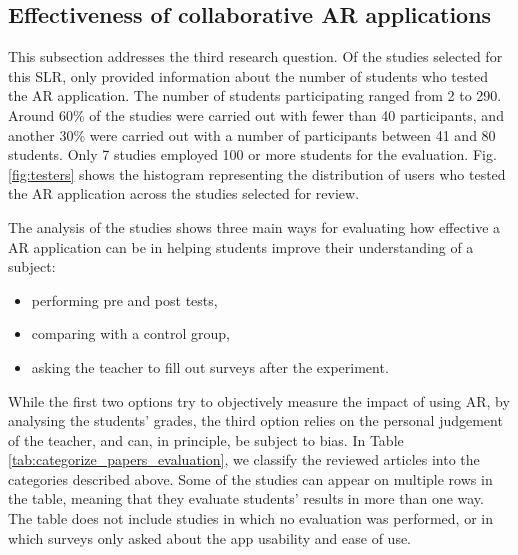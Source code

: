 \subsection{Effectiveness of collaborative AR applications}

This subsection addresses the third research question. Of the \papersSelected studies selected for this \gls{SLR}, only \papersWithNumStudentInfo provided information about the number of students who tested the AR application. The number of students participating ranged from 2 to 290. Around 60\% of the studies were carried out with fewer than 40 participants, and another 30\% were carried out with a number of participants between 41 and 80 students. Only 7 studies employed 100 or more students for the evaluation. Fig. \ref{fig:testers} shows the histogram representing the distribution of users who tested the \gls{AR} application across the studies selected for review.

The analysis of the studies shows three main ways for evaluating how effective a \gls{AR} application can be in helping students improve their understanding of a subject:
\begin{itemize}
    \item performing pre and post tests,
    \item comparing with a control group,
    \item asking the teacher to fill out surveys after the experiment.
\end{itemize}

% 	

While the first two options try to objectively measure the impact of using \gls{AR}, by analysing the students' grades, the third option relies on the personal judgement of the teacher, and can, in principle, be subject to bias.
In Table \ref{tab:categorize_papers_evaluation}, we classify the \papersSelected reviewed articles into the categories described above. Some of the studies can appear on multiple rows in the table, meaning that they evaluate students' results in more than one way. The table does not include studies in which no evaluation was performed, or in which surveys only asked about the app usability and ease of use.

